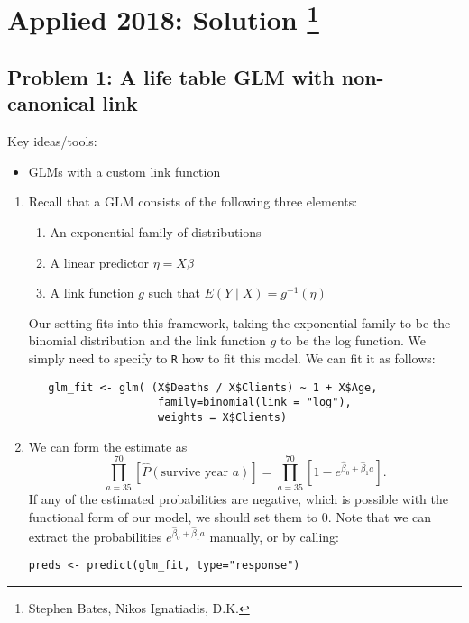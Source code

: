 \section{Applied 2018: Solution \footnote{Stephen Bates, Nikos Ignatiadis, D.K. }}



\subsection*{Problem 1: A life table GLM with non-canonical link}
Key ideas/tools:
\begin{itemize}
  \item GLMs with a custom link function
\end{itemize}

\begin{enumerate}[label=(\alph*)]
\item
  Recall that a GLM consists of the following three elements:
  \begin{enumerate}[label=(\arabic*)]
    \item An exponential family of distributions
    \item A linear predictor $\eta = X \beta$
    \item A link function $g$ such that $E(Y \mid X) = g^{-1}(\eta)$
  \end{enumerate}

  Our setting fits into this framework, taking the exponential family to be the binomial distribution and the link function $g$ to be the log function. We simply need to specify to \texttt{R} how to fit this model. We can fit it as follows:
  \begin{verbatim}
   glm_fit <- glm( (X$Deaths / X$Clients) ~ 1 + X$Age, 
                    family=binomial(link = "log"), 
                    weights = X$Clients)
  \end{verbatim}

\item
  We can form the estimate as 
  \begin{equation*}
    \prod_{a = 35}^{70}[\hat{P}(\text{survive year $a$})] = \prod_{a = 35}^{70}[1 - e^{\hat{\beta}_0 + \hat{\beta}_1 a}].
  \end{equation*}
  If any of the estimated probabilities are negative, which is possible with the functional form of our model, we should set them to 0. Note that we can extract the probabilities $e^{\hat{\beta}_0 + \hat{\beta}_1 a}$ manually, or by calling:

\begin{verbatim}
preds <- predict(glm_fit, type="response")
\end{verbatim}

\end{enumerate}

